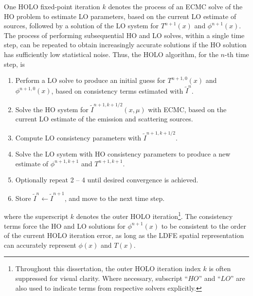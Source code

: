 One HOLO fixed-point iteration $k$ denotes the process of an ECMC solve of the HO problem to estimate LO parameters, based on
the current LO estimate of sources, followed by a solution of the 
LO system for $T^{n+1}(x)$ and $\phi^{n+1}(x)$.
The process of performing subsequential HO and LO solves, within a single time step,
can be repeated to obtain increasingly accurate solutions if the HO solution has
sufficiently low statistical noise.  Thus, the HOLO algorithm, for the $n$-th time step, is
\begin{enumerate}
\item Perform a LO solve to produce an initial guess for $T^{n+1,0}(x)$
    and $\phi^{n+1,0}(x)$, based on consistency terms estimated with $\tilde{I}^{n}$.
\item Solve the HO system for $\tilde{I}^{n+1,k+1/2}(x,\mu)$ with ECMC, based on the current
    LO estimate of the emission and scattering sources.%
\item Compute LO consistency parameters with $\tilde{I}^{n+1,k+1/2}$.  
\item Solve the LO system with HO consistency parameters to produce a new
    estimate of $\phi^{n+1,k+1}$ and $T^{n+1,k+1}$.
\item Optionally repeat 2 -- 4 until desired convergence is achieved.
\item Store $\tilde{I}^{n}\leftarrow\tilde{I}^{n+1}$, and move to the next time step.
\end{enumerate}
where the superscript $k$ denotes the outer HOLO iteration\footnote{Throughout this
    dissertation, the outer HOLO iteration index $k$ is often suppressed for visual clarity.
    Where necessary, subscript ``$HO$'' and ``$LO$'' are also used to indicate terms from
respective solvers explicitly.}.
The consistency terms force the HO
and LO solutions for $\phi^{n+1}(x)$ to be consistent to the order of the current HOLO
iteration error, as long as the LDFE spatial representation can accurately represent
$\phi(x)$ and $T(x)$.

